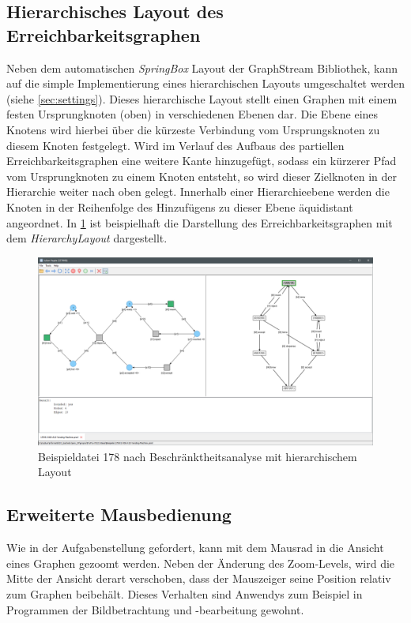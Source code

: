 \subsection{Hierarchisches Layout des Erreichbarkeitsgraphen}
Neben dem automatischen \emph{SpringBox} Layout der GraphStream Bibliothek, kann
auf die simple Implementierung eines hierarchischen Layouts umgeschaltet werden
(siehe \cref{sec:settings}). Dieses hierarchische Layout stellt einen Graphen
mit einem festen Ursprungknoten (oben) in verschiedenen Ebenen dar. Die Ebene
eines Knotens wird hierbei über die kürzeste Verbindung vom Ursprungsknoten zu
diesem Knoten festgelegt. Wird im Verlauf des Aufbaus des partiellen
Erreichbarkeitsgraphen eine weitere Kante hinzugefügt, sodass ein kürzerer Pfad
vom Ursprungknoten zu einem Knoten entsteht, so wird dieser Zielknoten in der
Hierarchie weiter nach oben gelegt. Innerhalb einer Hierarchieebene werden die
Knoten in der Reihenfolge des Hinzufügens zu dieser Ebene äquidistant
angeordnet. In \cref{img:ex178_hierarchy} ist beispielhaft die Darstellung des
Erreichbarkeitsgraphen mit dem \emph{HierarchyLayout} dargestellt.

\begin{figure}[ht!]
  \centering
  \includegraphics[width=\textwidth]{../img/Screenshot_178_hierarchy_layout.png}
  \caption{Beispieldatei 178 nach Beschränktheitsanalyse mit hierarchischem Layout}
  \label{img:ex178_hierarchy}
\end{figure}

\subsection{Erweiterte Mausbedienung}
Wie in der Aufgabenstellung gefordert, kann mit dem Mausrad in die Ansicht eines
Graphen gezoomt werden. Neben der Änderung des Zoom-Levels, wird die Mitte der
Ansicht derart verschoben, dass der Mauszeiger seine Position relativ zum
Graphen beibehält. Dieses Verhalten sind Anwendys zum Beispiel in Programmen der
Bildbetrachtung und -bearbeitung gewohnt.

